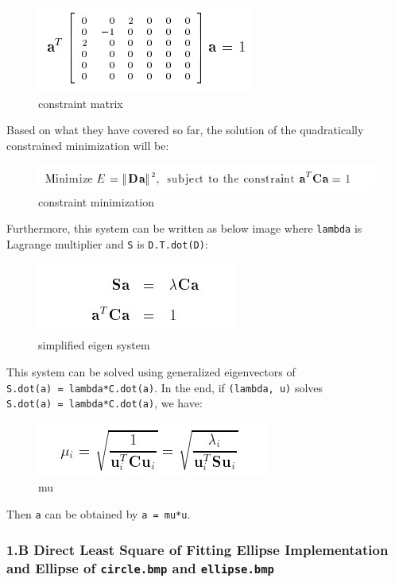 \documentclass[11pt]{article}
\makeatletter
\def\maxwidth{\ifdim\Gin@nat@width>\linewidth\linewidth
    \else\Gin@nat@width\fi}
\let\Oldincludegraphics\includegraphics
\renewcommand{\includegraphics}[1]{\Oldincludegraphics[width=.8\maxwidth]{#1}}
\makeatother
\begin{document}
\begin{figure}
\centering
\includegraphics{wiki/c.jpg}
\caption{constraint matrix}
\end{figure}

Based on what they have covered so far, the solution of the
quadratically constrained minimization will be:

\begin{figure}
\centering
\includegraphics{wiki/cm.jpg}
\caption{constraint minimization}
\end{figure}

Furthermore, this system can be written as below image where
\texttt{lambda} is Lagrange multiplier and \texttt{S} is
\texttt{D.T.dot(D)}:

\begin{figure}
\centering
\includegraphics{wiki/ss.jpg}
\caption{simplified eigen system}
\end{figure}

This system can be solved using generalized eigenvectors of
\texttt{S.dot(a)\ =\ lambda*C.dot(a)}. In the end, if
\texttt{(lambda,\ u)} solves \texttt{S.dot(a)\ =\ lambda*C.dot(a)}, we
have:

\begin{figure}
\centering
\includegraphics{wiki/mu.jpg}
\caption{mu}
\end{figure}

Then \texttt{a} can be obtained by \texttt{a\ =\ mu*u}.

    \hypertarget{b-direct-least-square-of-fitting-ellipse-implementation-and-ellipse-of-circle.bmp-and-ellipse.bmp}{%
\subsubsection{\texorpdfstring{1.B Direct Least Square of Fitting
Ellipse Implementation and Ellipse of \texttt{circle.bmp} and
\texttt{ellipse.bmp}}{1.B Direct Least Square of Fitting Ellipse Implementation and Ellipse of circle.bmp and ellipse.bmp}}\label{b-direct-least-square-of-fitting-ellipse-implementation-and-ellipse-of-circle.bmp-and-ellipse.bmp}}
\end{document}

